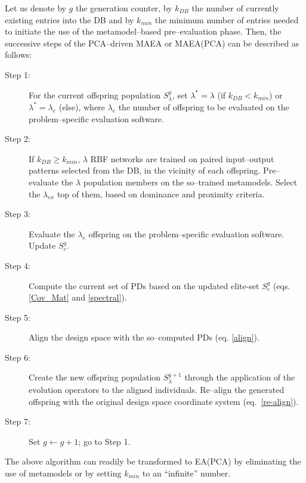 Let us denote  by $g$ the generation counter, by $k_{DB}$ the number of currently existing entries into the DB and by $k_{min}$ the minimum number of entries needed to initiate the use of the metamodel--based pre--evaluation phase. Then, the successive steps of the PCA--driven MAEA or MAEA(PCA) can be described as follows:
\begin{description}
  \item[Step 1:] For the current offspring population $S^{g}_\lambda$, set $\lambda^*\!=\!\lambda$ (if $k_{DB}\!<\!k_{min}$) or  $\lambda^*\!=\!\lambda_{e}$ (else), where $\lambda_{e}$ the number of offspring to be evaluated on the problem--specific evaluation software. 
  \item[Step 2:] If $k_{DB}\!\ge\!k_{min}$, $\lambda$ RBF networks are trained on paired input--output patterns selected from the DB, in the vicinity of each offspring. Pre--evaluate the $\lambda$ population members on the so--trained metamodels. Select the $\lambda_{ex}$ top of them, based on dominance and proximity criteria.
  \item[Step 3:] Evaluate the $\lambda_{e}$ offspring on the problem--specific evaluation software. Update $S^{g}_e$.
  \item[Step 4:] Compute the current set of PDs  based on the updated elite-set $S^{g}_e$ (eqs. \ref{Cov_Mat} and \ref{spectral}).
  \item[Step 5:] Align the design space with the so--computed PDs  (eq. \ref{align}). 
  \item[Step 6:] Create the new offspring population $S^{g+1}_\lambda$ through the application of the evolution operators to the aligned individuals. Re--align the generated offspring with the original design space coordinate system (eq.~\ref{re-align}).
  \item[Step 7:] Set $g\!\leftarrow\!g\!+\!1$; go to Step 1.
\end{description}
The above algorithm can readily be transformed to EA(PCA) by eliminating the use of metamodels or by setting $k_{min}$ to an ``infinite'' number.  


